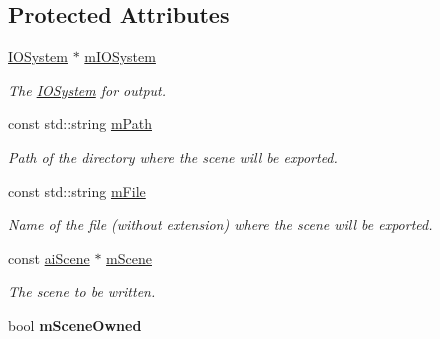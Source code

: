 \subsection*{Protected Attributes}
\begin{DoxyCompactItemize}
\item 
\hypertarget{class_assimp_1_1_collada_exporter_a903b6b36a8b6f93ce3834b7cdab237a6}{\hyperlink{class_assimp_1_1_i_o_system}{I\+O\+System} $\ast$ \hyperlink{class_assimp_1_1_collada_exporter_a903b6b36a8b6f93ce3834b7cdab237a6}{m\+I\+O\+System}}\label{class_assimp_1_1_collada_exporter_a903b6b36a8b6f93ce3834b7cdab237a6}

\begin{DoxyCompactList}\small\item\em The \hyperlink{class_assimp_1_1_i_o_system}{I\+O\+System} for output. \end{DoxyCompactList}\item 
\hypertarget{class_assimp_1_1_collada_exporter_af8ed385bbaa59c416a7720a3408c92ad}{const std\+::string \hyperlink{class_assimp_1_1_collada_exporter_af8ed385bbaa59c416a7720a3408c92ad}{m\+Path}}\label{class_assimp_1_1_collada_exporter_af8ed385bbaa59c416a7720a3408c92ad}

\begin{DoxyCompactList}\small\item\em Path of the directory where the scene will be exported. \end{DoxyCompactList}\item 
\hypertarget{class_assimp_1_1_collada_exporter_a3484348f94911dc754877b558aafbc16}{const std\+::string \hyperlink{class_assimp_1_1_collada_exporter_a3484348f94911dc754877b558aafbc16}{m\+File}}\label{class_assimp_1_1_collada_exporter_a3484348f94911dc754877b558aafbc16}

\begin{DoxyCompactList}\small\item\em Name of the file (without extension) where the scene will be exported. \end{DoxyCompactList}\item 
\hypertarget{class_assimp_1_1_collada_exporter_a87e4907a8631d5e55d11a1124bb2764e}{const \hyperlink{structai_scene}{ai\+Scene} $\ast$ \hyperlink{class_assimp_1_1_collada_exporter_a87e4907a8631d5e55d11a1124bb2764e}{m\+Scene}}\label{class_assimp_1_1_collada_exporter_a87e4907a8631d5e55d11a1124bb2764e}

\begin{DoxyCompactList}\small\item\em The scene to be written. \end{DoxyCompactList}\item 
\hypertarget{class_assimp_1_1_collada_exporter_ae6ff309e00ef6c38c610adaef4f26b3c}{bool {\bfseries m\+Scene\+Owned}}\label{class_assimp_1_1_collada_exporter_ae6ff309e00ef6c38c610adaef4f26b3c}


\end{DoxyCompactItemize}
